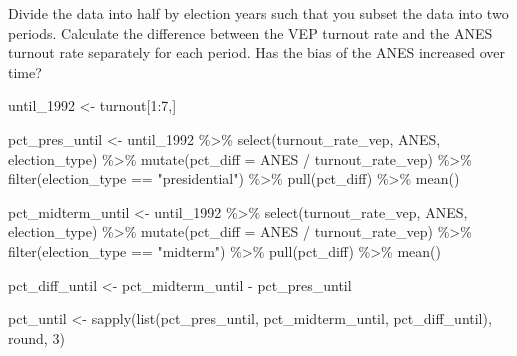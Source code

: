 \documentclass[
  letterpaper,
  DIV=11,
  numbers=noendperiod]{scrartcl}
\newenvironment{Shaded}{\begin{snugshade}}{\end{snugshade}}
\newcommand{\AttributeTok}[1]{\textcolor[rgb]{0.40,0.45,0.13}{#1}}
\newcommand{\DecValTok}[1]{\textcolor[rgb]{0.68,0.00,0.00}{#1}}
\newcommand{\FunctionTok}[1]{\textcolor[rgb]{0.28,0.35,0.67}{#1}}
\newcommand{\NormalTok}[1]{\textcolor[rgb]{0.00,0.23,0.31}{#1}}
\newcommand{\OtherTok}[1]{\textcolor[rgb]{0.00,0.23,0.31}{#1}}
\newcommand{\SpecialCharTok}[1]{\textcolor[rgb]{0.37,0.37,0.37}{#1}}
\newcommand{\StringTok}[1]{\textcolor[rgb]{0.13,0.47,0.30}{#1}}
\begin{document}
Divide the data into half by election years such that you subset the
data into two periods. Calculate the difference between the VEP turnout
rate and the ANES turnout rate separately for each period. Has the bias
of the ANES increased over time?

\begin{Shaded}
\begin{Highlighting}[]
\NormalTok{until\_1992 }\OtherTok{\textless{}{-}}\NormalTok{ turnout[}\DecValTok{1}\SpecialCharTok{:}\DecValTok{7}\NormalTok{,]}

\NormalTok{pct\_pres\_until }\OtherTok{\textless{}{-}}\NormalTok{ until\_1992 }\SpecialCharTok{\%\textgreater{}\%} 
  \FunctionTok{select}\NormalTok{(turnout\_rate\_vep, ANES, election\_type) }\SpecialCharTok{\%\textgreater{}\%} 
  \FunctionTok{mutate}\NormalTok{(}\AttributeTok{pct\_diff =}\NormalTok{ ANES }\SpecialCharTok{/}\NormalTok{ turnout\_rate\_vep) }\SpecialCharTok{\%\textgreater{}\%} 
  \FunctionTok{filter}\NormalTok{(election\_type }\SpecialCharTok{==} \StringTok{"presidential"}\NormalTok{) }\SpecialCharTok{\%\textgreater{}\%} 
  \FunctionTok{pull}\NormalTok{(pct\_diff) }\SpecialCharTok{\%\textgreater{}\%} 
  \FunctionTok{mean}\NormalTok{()}

\NormalTok{pct\_midterm\_until }\OtherTok{\textless{}{-}}\NormalTok{ until\_1992 }\SpecialCharTok{\%\textgreater{}\%} 
  \FunctionTok{select}\NormalTok{(turnout\_rate\_vep, ANES, election\_type) }\SpecialCharTok{\%\textgreater{}\%} 
  \FunctionTok{mutate}\NormalTok{(}\AttributeTok{pct\_diff =}\NormalTok{ ANES }\SpecialCharTok{/}\NormalTok{ turnout\_rate\_vep) }\SpecialCharTok{\%\textgreater{}\%} 
  \FunctionTok{filter}\NormalTok{(election\_type }\SpecialCharTok{==} \StringTok{"midterm"}\NormalTok{) }\SpecialCharTok{\%\textgreater{}\%} 
  \FunctionTok{pull}\NormalTok{(pct\_diff) }\SpecialCharTok{\%\textgreater{}\%} 
  \FunctionTok{mean}\NormalTok{()}

\NormalTok{pct\_diff\_until }\OtherTok{\textless{}{-}}\NormalTok{ pct\_midterm\_until }\SpecialCharTok{{-}}\NormalTok{ pct\_pres\_until}

\NormalTok{pct\_until }\OtherTok{\textless{}{-}} \FunctionTok{sapply}\NormalTok{(}\FunctionTok{list}\NormalTok{(pct\_pres\_until, pct\_midterm\_until, pct\_diff\_until), round, }\DecValTok{3}\NormalTok{)}
\end{Highlighting}
\end{Shaded}
\end{document}
